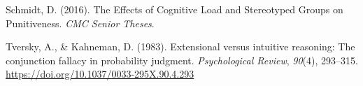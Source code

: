 \documentclass[
  american,
  man,floatsintext]{apa7}
\begin{document}
\leavevmode\hypertarget{ref-schmidt_effects_2016}{}%
Schmidt, D. (2016). The Effects of Cognitive Load and Stereotyped Groups on Punitiveness. \emph{CMC Senior Theses}.

\leavevmode\hypertarget{ref-tversky_extensional_1983}{}%
Tversky, A., \& Kahneman, D. (1983). Extensional versus intuitive reasoning: The conjunction fallacy in probability judgment. \emph{Psychological Review}, \emph{90}(4), 293--315. \url{https://doi.org/10.1037/0033-295X.90.4.293}


\clearpage
\renewcommand{\listfigurename}{Figure captions}

\clearpage
\renewcommand{\listtablename}{Table captions}
\end{document}
